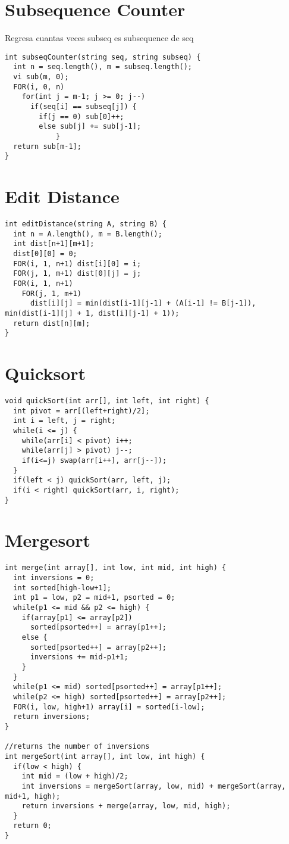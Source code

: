 \documentclass[11pt, oneside]{article}
\begin{document}
\section{Subsequence Counter}
Regresa cuantas veces subseq es subsequence de seq
\begin{lstlisting}
int subseqCounter(string seq, string subseq) {
  int n = seq.length(), m = subseq.length();
  vi sub(m, 0);
  FOR(i, 0, n)
    for(int j = m-1; j >= 0; j--)
      if(seq[i] == subseq[j]) {
        if(j == 0) sub[0]++;
        else sub[j] += sub[j-1];
            }
  return sub[m-1];
}

\end{lstlisting}
\section{Edit Distance}
\begin{lstlisting}
int editDistance(string A, string B) {
  int n = A.length(), m = B.length();
  int dist[n+1][m+1];
  dist[0][0] = 0;
  FOR(i, 1, n+1) dist[i][0] = i;
  FOR(j, 1, m+1) dist[0][j] = j;
  FOR(i, 1, n+1)
    FOR(j, 1, m+1)
      dist[i][j] = min(dist[i-1][j-1] + (A[i-1] != B[j-1]), min(dist[i-1][j] + 1, dist[i][j-1] + 1));
  return dist[n][m];
}

\end{lstlisting}
\section{Quicksort}
\begin{lstlisting}
void quickSort(int arr[], int left, int right) {
  int pivot = arr[(left+right)/2];
  int i = left, j = right;
  while(i <= j) {
    while(arr[i] < pivot) i++;
    while(arr[j] > pivot) j--;
    if(i<=j) swap(arr[i++], arr[j--]);
  }
  if(left < j) quickSort(arr, left, j);
  if(i < right) quickSort(arr, i, right);
}

\end{lstlisting}
\section{Mergesort}
\begin{lstlisting}
int merge(int array[], int low, int mid, int high) {
  int inversions = 0;
  int sorted[high-low+1];
  int p1 = low, p2 = mid+1, psorted = 0;
  while(p1 <= mid && p2 <= high) {
    if(array[p1] <= array[p2])
      sorted[psorted++] = array[p1++];
    else {
      sorted[psorted++] = array[p2++];
      inversions += mid-p1+1;
    }
  }
  while(p1 <= mid) sorted[psorted++] = array[p1++];
  while(p2 <= high) sorted[psorted++] = array[p2++];
  FOR(i, low, high+1) array[i] = sorted[i-low];
  return inversions;
}

//returns the number of inversions
int mergeSort(int array[], int low, int high) {
  if(low < high) {
    int mid = (low + high)/2;
    int inversions = mergeSort(array, low, mid) + mergeSort(array, mid+1, high);
    return inversions + merge(array, low, mid, high);
  }
  return 0;
}

\end{lstlisting}
\end{document}
